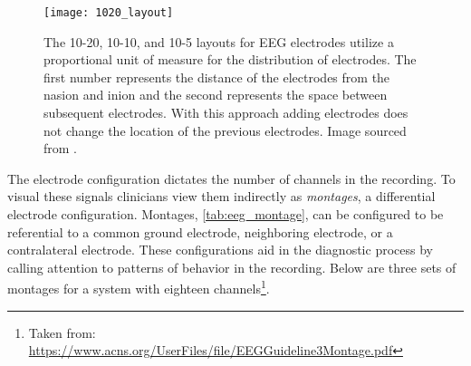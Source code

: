 \begin{figure}[ht]
\centering
\texttt{[image: 1020\_layout]}
\caption[10-20 EEG Configuration]{The 10-20, 10-10, and 10-5 layouts for \ac{EEG} electrodes utilize a proportional unit of measure for the distribution of electrodes. The first number represents the distance of the electrodes from the nasion and inion and the second represents the space between subsequent electrodes. With this approach adding electrodes does not change the location of the previous electrodes. Image sourced from \cite{Cheng2011}.}
\label{fig:eeg_1020layout}
\end{figure}

The electrode configuration dictates the number of channels in the recording. To visual these signals clinicians view them indirectly as \textit{montages}, a differential electrode configuration. Montages, \cref{tab:eeg_montage}, can be configured to be referential to a common ground electrode, neighboring electrode, or a contralateral electrode. These configurations aid in the diagnostic process by calling attention to patterns of behavior in the recording. Below are three sets of montages for a system with eighteen channels\footnote{Taken from: \url{https://www.acns.org/UserFiles/file/EEGGuideline3Montage.pdf} }.

